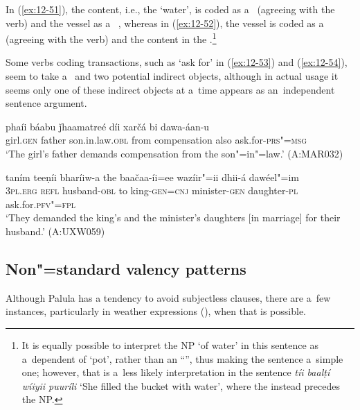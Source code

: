 In (\ref{ex:12-51}), the content, i.e., the `water', is coded as a~ (agreeing with the  verb) and the vessel as a~ , whereas in (\ref{ex:12-52}), the vessel is coded as a~ (agreeing with the  verb) and the content in the .\footnote{It is equally possible to interpret the  NP `of water' in this sentence as a~dependent of `pot', rather than an ``'', thus making the sentence a~simple  one; however, that is a~less likely interpretation in the sentence \textit{tíi baalṭí wíiyii puuríli} `She filled the bucket with water', where the  instead precedes the  NP.} 


Some verbs coding transactions, such as `ask for' in (\ref{ex:12-53}) and (\ref{ex:12-54}), seem to take a~ and two potential indirect objects, although in actual usage it seems only one of these indirect objects at a~time appears as an~independent sentence argument. 

\begin{exe}
\ex
\label{ex:12-53}
\gll phaíi báabu ǰhaamatreé díi xarčá bi dawa-áan-u \\
girl.\textsc{gen} father son.in.law.\textsc{obl} from compensation also ask.for-\textsc{prs"=msg} \\
\glt `The girl's father demands compensation from the son"=in"=law.' (A:MAR032)
\end{exe}
\begin{exe}
\ex
\label{ex:12-54}
\gll taním teeṇíi bharíiw-a the baačaa-íi=ee wazíir"=ii dhii-á dawéel"=im \\
3\textsc{pl.erg} \textsc{refl} husband-\textsc{obl} to king-\textsc{gen=cnj}  minister-\textsc{gen} daughter-\textsc{pl} ask.for.\textsc{pfv"=fpl}\\
\glt `They demanded the king's and the minister's daughters [in marriage] for their husband.' (A:UXW059)
\end{exe}

\subsection{Non"=standard {valency} patterns}
\label{subsec:12-2-6}

 Although Palula  has a tendency to avoid subjectless clauses, there are a~few instances, particularly in weather expressions (), when that is possible.


